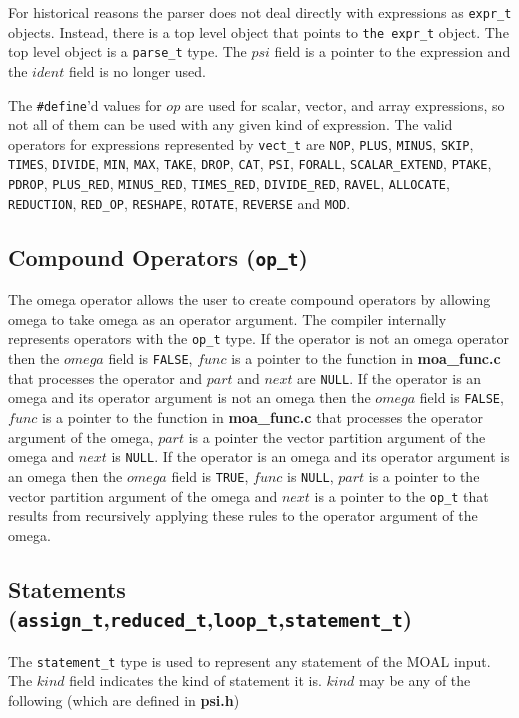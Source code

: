 For historical reasons the parser does not deal directly with expressions
as {\tt expr\_t} objects.  Instead, there is a top level object that points
to {\tt the expr\_t} object.  The top level object is a {\tt parse\_t} type.
The $psi$ field is a pointer to the expression and the $ident$ field is no
longer used.

The {\tt \#define}'d values for $op$ are used for scalar, vector, and array 
expressions, so not all of them can be used with any given kind of expression.
The valid operators for expressions represented by {\tt vect\_t} are
{\tt NOP}, {\tt PLUS}, {\tt MINUS}, {\tt SKIP}, {\tt TIMES}, {\tt DIVIDE},
{\tt MIN}, {\tt MAX}, {\tt TAKE}, {\tt DROP}, {\tt CAT}, {\tt PSI},
{\tt FORALL}, {\tt SCALAR\_EXTEND}, {\tt PTAKE}, {\tt PDROP}, {\tt PLUS\_RED}, 
{\tt MINUS\_RED}, {\tt TIMES\_RED}, {\tt DIVIDE\_RED}, {\tt RAVEL},
{\tt ALLOCATE}, {\tt REDUCTION}, {\tt RED\_OP}, {\tt RESHAPE}, {\tt ROTATE},
{\tt REVERSE} and {\tt MOD}.

\subsection{Compound Operators ({\tt op\_t})}
The omega operator allows the user to create compound operators by allowing
omega to take omega as an operator argument.  The compiler internally 
represents 
operators with the {\tt op\_t} type.  If the operator is not an omega operator
then the $omega$ field is {\tt FALSE}, $func$ is a pointer to the function in
{\bf moa\_func.c} that processes the operator and $part$ and $next$ are {\tt NULL}.
If the operator is an omega and its operator argument is not an omega then
the $omega$ field is {\tt FALSE}, $func$ is a pointer to the function in
{\bf moa\_func.c} that processes the operator argument of the omega, $part$ 
is a pointer the vector partition argument of the omega and $next$ is {\tt NULL}.
If the operator is an omega and its operator argument is an omega then
the $omega$ field is {\tt TRUE}, $func$ is {\tt NULL}, $part$ is a pointer to the
vector partition argument of the omega and $next$ is a pointer to the
{\tt op\_t} that results from recursively applying these rules to the operator
argument of the omega.

\subsection{Statements ({\tt assign\_t},{\tt reduced\_t},{\tt loop\_t},{\tt statement\_t})}
The {\tt statement\_t} type is used to represent any statement of the MOAL
input.  The $kind$ field indicates the kind of statement it is.
$kind$ may be any of the following (which are defined in {\bf psi.h})

